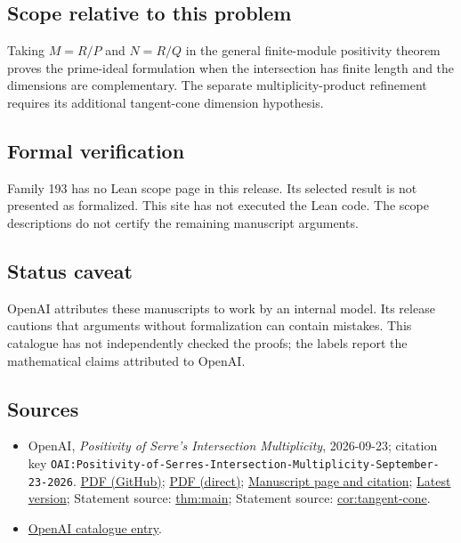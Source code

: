 \documentclass[11pt]{article}
\begin{document}
\subsection{Scope relative to this problem}
Taking $M=R/P$ and $N=R/Q$ in the general finite-module positivity theorem proves the prime-ideal formulation when the intersection has finite length and the dimensions are complementary. The separate multiplicity-product refinement requires its additional tangent-cone dimension hypothesis.

\subsection{Formal verification}
Family 193 has no Lean scope page in this release. Its selected result is not presented as formalized. This site has not executed the Lean code. The scope descriptions do not certify the remaining manuscript arguments.

\subsection{Status caveat}
OpenAI attributes these manuscripts to work by an internal model. Its release cautions that arguments without formalization can contain mistakes. This catalogue has not independently checked the proofs; the labels report the mathematical claims attributed to OpenAI.

\subsection{Sources}
\begin{itemize}
\item OpenAI, \emph{Positivity of Serre's Intersection Multiplicity}, 2026-09-23; citation key \texttt{OAI:Positivity-of-Serres-Intersection-Multiplicity-September-23-2026}. \href{https://github.com/openai/math/blob/adc7f1241b42e322a6451854ab7e4b4c146bf78a/preprints/Positivity-of-Serres-Intersection-Multiplicity-September-23-2026/paper.pdf}{PDF (GitHub)}; \href{https://github.com/openai/math/raw/adc7f1241b42e322a6451854ab7e4b4c146bf78a/preprints/Positivity-of-Serres-Intersection-Multiplicity-September-23-2026/paper.pdf}{PDF (direct)}; \href{https://github.com/openai/math/blob/adc7f1241b42e322a6451854ab7e4b4c146bf78a/preprints/Positivity-of-Serres-Intersection-Multiplicity-September-23-2026/README.md}{Manuscript page and citation}; \href{https://github.com/openai/math/blob/main/preprints/Positivity-of-Serres-Intersection-Multiplicity-September-23-2026/paper.pdf}{Latest version}; Statement source: \href{https://github.com/openai/math/blob/adc7f1241b42e322a6451854ab7e4b4c146bf78a/preprints/Positivity-of-Serres-Intersection-Multiplicity-September-23-2026/build/sections/introduction.tex\#L16}{thm:main}; Statement source: \href{https://github.com/openai/math/blob/adc7f1241b42e322a6451854ab7e4b4c146bf78a/preprints/Positivity-of-Serres-Intersection-Multiplicity-September-23-2026/build/sections/introduction.tex\#L200}{cor:tangent-cone}.
\item \href{https://github.com/openai/math/blob/adc7f1241b42e322a6451854ab7e4b4c146bf78a/CONTENTS.md}{OpenAI catalogue entry}.
\end{itemize}
\end{document}
